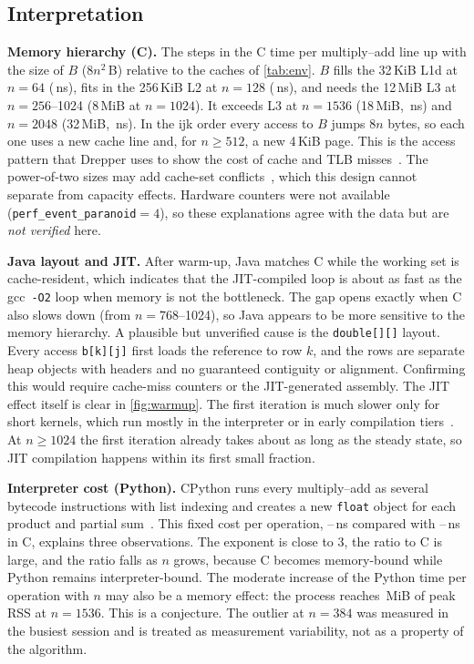\documentclass[conference,a4paper]{IEEEtran}
\begin{document}
\subsection{Interpretation}
\textbf{Memory hierarchy (C).} The steps in the C time per multiply--add line up with the size of $B$ ($8n^2$\,B)
relative to the caches of \cref{tab:env}. $B$ fills the 32\,KiB L1d at $n=64$ (\NsMaddCSixtyFour\,ns), fits in the
256\,KiB L2 at $n=128$ (\NsMaddCOneTwoEight\,ns), and needs the 12\,MiB L3 at $n=256$--1024 (8\,MiB at $n=1024$).
It exceeds L3 at $n=1536$ (18\,MiB, \NsMaddCFifteenThirtySix\,ns) and $n=2048$ (32\,MiB, \NsMaddCTwentyFortyEight\,ns).
In the ijk order every access to $B$ jumps $8n$ bytes, so each one uses a new cache line and, for $n\ge512$, a new
4\,KiB page. This is the access pattern that Drepper uses to show the cost of cache and TLB misses~\cite{drepper2007}.
The power-of-two sizes may add cache-set conflicts~\cite{lam1991}, which this design cannot separate from capacity
effects. Hardware counters were not available (\texttt{perf\_event\_paranoid}$=4$), so these explanations agree
with the data but are \emph{not verified} here.

\textbf{Java layout and JIT.} After warm-up, Java matches C while the working set is cache-resident, which
indicates that the JIT-compiled loop is about as fast as the gcc~\texttt{-O2} loop when memory is not the
bottleneck. The gap opens exactly when C also slows down (from $n=768$--1024), so Java appears to be more sensitive
to the memory hierarchy. A plausible but unverified cause is the \texttt{double[][]} layout. Every access
\texttt{b[k][j]} first loads the reference to row $k$, and the rows are separate heap objects with headers and no
guaranteed contiguity or alignment. Confirming this would require cache-miss counters or the JIT-generated
assembly. The JIT effect itself is clear in \cref{fig:warmup}. The first iteration is much slower only for short
kernels, which run mostly in the interpreter or in early compilation tiers~\cite{georges2007}. At $n\ge1024$ the
first iteration already takes about as long as the steady state, so JIT compilation happens within its first small
fraction.

\textbf{Interpreter cost (Python).} CPython runs every multiply--add as several bytecode instructions with list
indexing and creates a new \texttt{float} object for each product and partial sum~\cite{pep659,pydocsys}. This
fixed cost per operation, \NsMaddPythonMin--\NsMaddPythonFifteenThirtySix\,ns compared with \NsMaddCMin--\NsMaddCMax\,ns in C,
explains three observations. The exponent is close to 3, the ratio to C is large, and the ratio falls as $n$ grows,
because C becomes memory-bound while Python remains interpreter-bound. The moderate increase of the Python time per
operation with $n$ may also be a memory effect: the process reaches \RssPythonFifteenThirtySix\,MiB of peak RSS at
$n=1536$. This is a conjecture. The outlier at $n=384$ was measured in the busiest session and is treated as
measurement variability, not as a property of the algorithm.
\end{document}
